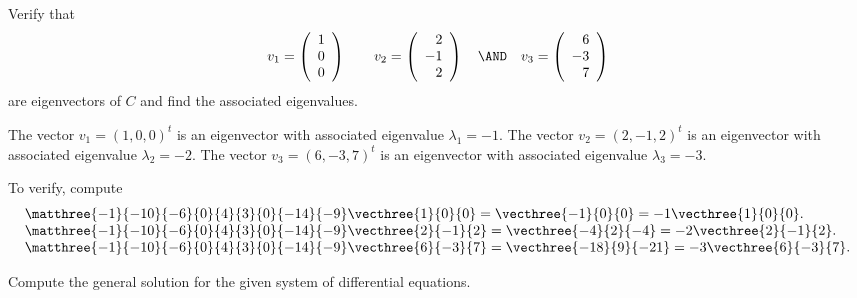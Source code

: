 \documentclass{article}
\begin{document}
\begin{exercise} \label{c6.1.3a}
Verify that
\[
v_1 = \left(\begin{array}{r} 1 \\ 0\\ 0\end{array}\right) \qquad
v_2 = \left(\begin{array}{r} 2 \\ -1\\ 2\end{array}\right) \quad \AND \quad
v_3 = \left(\begin{array}{r} 6 \\ -3\\ 7\end{array}\right)
\]
are eigenvectors of $C$ and find the associated eigenvalues.

\begin{solution}

\ans The vector $v_1 = (1,0,0)^t$ is an eigenvector with associated
eigenvalue $\lambda_1 = -1$.  The vector $v_2 = (2,-1,2)^t$ is an
eigenvector with associated eigenvalue $\lambda_2 = -2$.  The vector
$v_3 = (6,-3,7)^t$ is an eigenvector with associated eigenvalue
$\lambda_3 = -3$.

\soln To verify, compute
\[
\begin{array}{l}
\matthree{-1}{-10}{-6}{0}{4}{3}{0}{-14}{-9}\vecthree{1}{0}{0} =
\vecthree{-1}{0}{0} = -1\vecthree{1}{0}{0}. \\
\matthree{-1}{-10}{-6}{0}{4}{3}{0}{-14}{-9}\vecthree{2}{-1}{2} =
\vecthree{-4}{2}{-4} = -2\vecthree{2}{-1}{2}. \\
\matthree{-1}{-10}{-6}{0}{4}{3}{0}{-14}{-9}\vecthree{6}{-3}{7} =
\vecthree{-18}{9}{-21} = -3\vecthree{6}{-3}{7}.
\end{array}
\]

\end{solution}
\end{exercise}





\problemlabel

Compute the general solution for the given system of differential equations.
\end{document}

